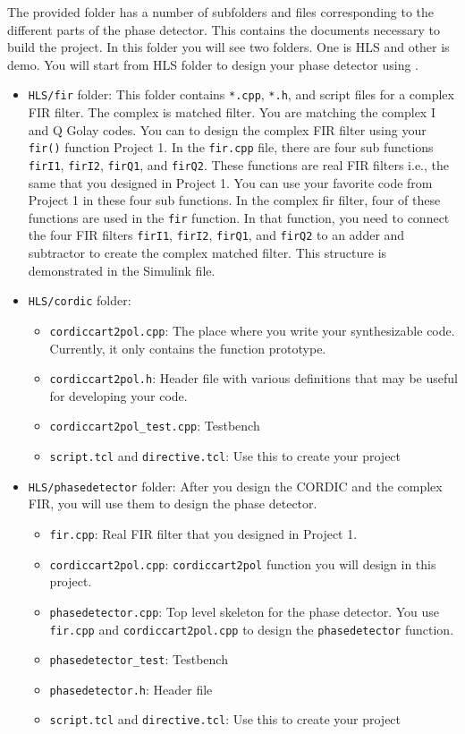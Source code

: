 The provided folder has a number of subfolders and files corresponding to the different parts of the phase detector.  This contains the documents necessary to build the project. In this folder you will see two folders. One is HLS and other is demo. You will start from HLS folder to design your phase detector using \VHLS.
\begin{itemize} 
\item \texttt{HLS/fir} folder: This folder contains \texttt{*.cpp}, \texttt{*.h}, and script files for a complex FIR filter. The complex is matched filter. You are matching the complex I and Q Golay codes. You can to design the complex FIR filter using your \texttt{fir()} function Project 1. In the \texttt{fir.cpp} file, there are four sub functions \texttt{firI1}, \texttt{firI2}, \texttt{firQ1}, and \texttt{firQ2}. These functions are real FIR filters i.e., the same that you designed in Project 1. You can use your favorite code from Project 1 in these four sub functions. In the complex fir filter, four of these functions are used in the \texttt{fir} function. In that function, you need to connect the four FIR filters \texttt{firI1}, \texttt{firI2}, \texttt{firQ1}, and \texttt{firQ2} to an adder and subtractor to create the complex matched filter. This structure is demonstrated in the Simulink file. 

\item \texttt{HLS/cordic} folder:
\begin{itemize}
\item \texttt{cordiccart2pol.cpp}: The place where you write your synthesizable code. Currently, it only contains the function prototype. 
\item \texttt{cordiccart2pol.h}: Header file with various definitions that may be useful for developing your code.
\item \texttt{cordiccart2pol\_test.cpp}: Testbench
\item \texttt{script.tcl} and \texttt{directive.tcl}: Use this to create your project
\end{itemize}

\item \texttt{HLS/phasedetector} folder: After you design the CORDIC and the complex FIR, you will use them to design the phase detector. 
\begin{itemize}
\item \texttt{fir.cpp}:  Real FIR filter that you designed in Project 1. 
\item \texttt{cordiccart2pol.cpp}: \texttt{cordiccart2pol} function you will design in this project.
\item \texttt{phasedetector.cpp}: Top level skeleton for the phase detector. You use \texttt{fir.cpp} and \texttt{cordiccart2pol.cpp} to design the \texttt{phasedetector} function. 
\item \texttt{phasedetector\_test}: Testbench
\item \texttt{phasedetector.h}: Header file
\item \texttt{script.tcl} and \texttt{directive.tcl}: Use this to create your project
\end{itemize}


\end{itemize}
